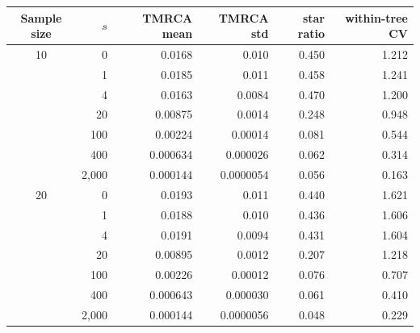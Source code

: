\begin{tabular}{crrrrr}
\toprule
Sample size & $s$ & TMRCA mean & TMRCA std & star ratio & within-tree CV \\
\midrule
10 & 0 & 0.0168 & 0.010 & 0.450 & 1.212 \\
 & 1 & 0.0185 & 0.011 & 0.458 & 1.241 \\
 & 4 & 0.0163 & 0.0084 & 0.470 & 1.200 \\
 & 20 & 0.00875 & 0.0014 & 0.248 & 0.948 \\
 & 100 & 0.00224 & 0.00014 & 0.081 & 0.544 \\
 & 400 & 0.000634 & 0.000026 & 0.062 & 0.314 \\
 & 2{,}000 & 0.000144 & 0.0000054 & 0.056 & 0.163 \\
20 & 0 & 0.0193 & 0.011 & 0.440 & 1.621 \\
 & 1 & 0.0188 & 0.010 & 0.436 & 1.606 \\
 & 4 & 0.0191 & 0.0094 & 0.431 & 1.604 \\
 & 20 & 0.00895 & 0.0012 & 0.207 & 1.218 \\
 & 100 & 0.00226 & 0.00012 & 0.076 & 0.707 \\
 & 400 & 0.000643 & 0.000030 & 0.061 & 0.410 \\
 & 2{,}000 & 0.000144 & 0.0000056 & 0.048 & 0.229 \\
\bottomrule
\end{tabular}
